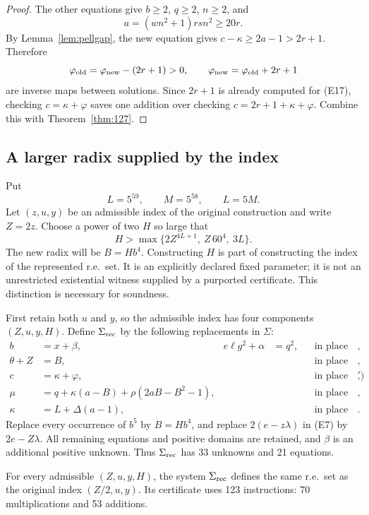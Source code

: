 \begin{proof}
The other equations give $b\ge2$, $q\ge2$, $n\ge2$, and
\[
 a=(wn^2+1)rsn^2\ge20r.
\]
By Lemma~\ref{lem:pellgap}, the new equation gives
$c-\kappa\ge2a-1>2r+1$. Therefore
\[
 \varphi_{\rm old}=\varphi_{\rm new}-(2r+1)>0,
 \qquad
 \varphi_{\rm new}=\varphi_{\rm old}+2r+1
\]
are inverse maps between solutions. Since $2r+1$ is already computed for
(E17), checking $c=\kappa+\varphi$ saves one addition over checking
$c=2r+1+\kappa+\varphi$. Combine this with Theorem~\ref{thm:127}.
\end{proof}

\subsection{A larger radix supplied by the index}

Put
\[
 L=5^{59},\qquad M=5^{58},\qquad L=5M.
\]
Let $(z,u,y)$ be an admissible index of the original construction and
write $Z=2z$. Choose a power of two $H$ so large that
\begin{equation}
 H>\max\{2Z^{4L+1},\ Z\,60^4,\ 3L\}.
 \label{eq:index-H}
\end{equation}
The new radix will be $B=Hb^4$. Constructing $H$ is part of constructing
the index of the represented r.e.\ set. It is an explicitly declared
fixed parameter; it is not an unrestricted existential witness supplied
by a purported certificate. This distinction is necessary for soundness.

First retain both $u$ and $y$, so the admissible index has four
components $(Z,u,y,H)$. Define $\Sigma_{\rm rec}$ by the following
replacements in $\Sigma$:
\begin{align*}
 b&=x+\beta, & e\ell g^2+\alpha&=q^2,
       &&\text{in place of (E1)},\\
 \theta+Z&=B, &&&&\text{in place of (E3)},\\
 c&=\kappa+\varphi, &&&&\text{in place of (E13$'$)},\\
 \mu&=q+\kappa(a-B)+\rho(2aB-B^2-1),
       &&&&\text{in place of (E18)},\\
 \kappa&=L+\Delta(a-1), &&&&\text{in place of (E20)}.
\end{align*}
Replace every occurrence of $b^5$ by $B=Hb^4$, and replace
$2(e-z\lambda)$ in (E7) by $2e-Z\lambda$. All remaining equations and
positive domains are retained, and $\beta$ is an additional positive
unknown. Thus $\Sigma_{\rm rec}$ has 33 unknowns and 21 equations.

\begin{theorem}\label{thm:123}
For every admissible $(Z,u,y,H)$, the system $\Sigma_{\rm rec}$ defines
the same r.e.\ set as the original index $(Z/2,u,y)$. Its certificate
uses 123 instructions: 70 multiplications and 53 additions.
\end{theorem}

